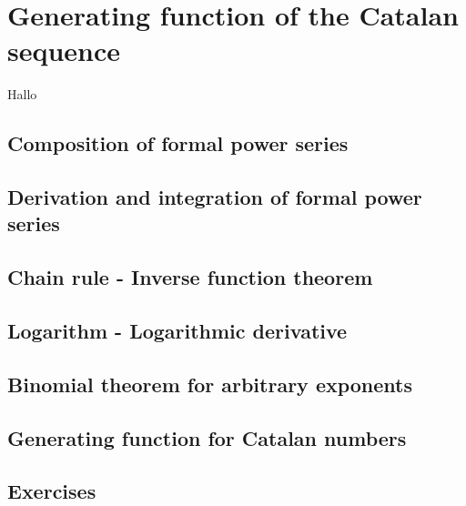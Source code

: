 \section{Generating function of the Catalan sequence}\label{generatingFunctions2} 

Hallo

\subsection{Composition of formal power series}

\subsection{Derivation and integration of formal power series}

\subsection{Chain rule - Inverse function theorem}

\subsection{Logarithm - Logarithmic derivative}

\subsection{Binomial theorem for arbitrary exponents}

\subsection{Generating function for Catalan numbers}

\subsection{Exercises}